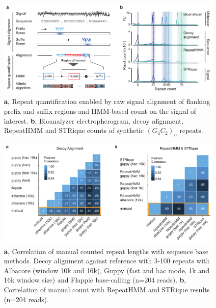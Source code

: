 \begin{figure}[h]
    \centering
    \includegraphics[width=1.0\textwidth]{figures/strique/count_structure_plasmid.pdf}
    \captionsetup{format=plain}
    \caption[STRique: generic repeat detection pipeline on raw nanopore signals.]{\textbf{a}, Repeat quantification enabled by raw signal alignment of flanking prefix and suffix regions and HMM-based count on the signal of interest. \textbf{b}, Bioanalyzer electropherogram, decoy alignment, RepeatHMM and STRique counts of synthetic $ (G_{4}C_{2})_{n} $ repeats.}
    \label{fig:strique:count_structure_plasmid}
\end{figure}

\begin{figure}[h]
    \centering
    \includegraphics[width=1.0\textwidth]{figures/strique/count_sequence_corr.pdf}
    \captionsetup{format=plain}
    \caption[Correlation of sequence based STR detection methods]{\textbf{a}, Correlation of manual counted repeat lengths with sequence base methods. Decoy alignment against reference with 3-100 repeats with Albacore (window 10k and 16k), Guppy (fast and hac mode, 1k and 16k window size) and Flappie base-calling (n=204 reads). \textbf{b}, Correlation of manual count with RepeatHMM and STRique results (n=204 reads).}
    \label{fig:strique:count_sequence_corr}
\end{figure}

